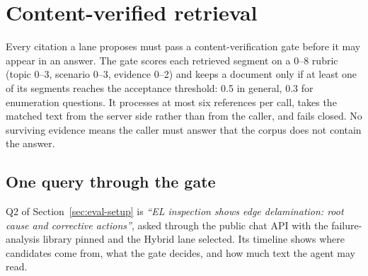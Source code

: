 \section{Content-verified retrieval}
\label{sec:retrieval}
\label{sec:lanes}

Every citation a lane proposes must pass a content-verification gate before it
may appear in an answer. The gate scores each retrieved segment on a 0--8 rubric
(topic 0--3, scenario 0--3, evidence 0--2) and keeps a document only if at least
one of its segments reaches the acceptance threshold: 0.5 in general, 0.3 for
enumeration questions. It processes at most six references per call, takes the
matched text from the server side rather than from the caller, and fails closed.
No surviving evidence means the caller must answer that the corpus does not
contain the answer.

\subsection{One query through the gate}
\label{sec:trace}

Q2 of Section~\ref{sec:eval-setup} is \emph{``EL inspection shows edge delamination:
root cause and corrective actions''}, asked through the public chat API with the
failure-analysis library pinned and the Hybrid lane selected. Its timeline shows
where candidates come from, what the gate decides, and how much text the agent
may read.

